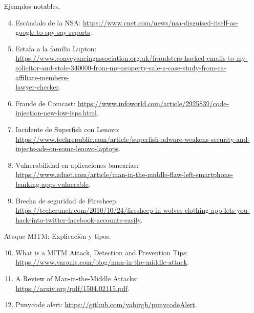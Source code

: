 \documentclass[11pt]{article}
\begin{document}
Ejemplos notables.
\begin{enumerate}
	\setcounter{enumi}{3}
	\item\label{bib-item-4} Escándalo de la NSA: \href{https://www.cnet.com/news/nsa-disguised-itself-as-google-to-spy-say-reports}{https://www.cnet.com/news/nsa-disguised-itself-as-google-to-spy-say-reports}.
	\item\label{bib-item-5} Estafa a la familia Lupton: \href{https://www.conveyancingassociation.org.uk/fraudsters-hacked-emails-to-my-solicitor-and-stole-340000-from-my-property-sale-a-case-study-from-ca-affiliate-members-lawyer-checker}{https://www.conveyancingassociation.org.uk/fraudsters-hacked-emails-to-my-solicitor-and-stole-340000-from-my-property-sale-a-case-study-from-ca-affiliate-members-\\lawyer-checker}.
	\item\label{bib-item-6} Fraude de Comcast: \href{https://www.infoworld.com/article/2925839/code-injection-new-low-isps.html}{https://www.infoworld.com/article/2925839/code-injection-new-low-isps.html}.
	\item\label{bib-item-7} Incidente de Superfish con Lenovo: \href{https://www.techrepublic.com/article/superfish-adware-weakens-security-and-injects-ads-on-some-lenovo-laptops}{https://www.techrepublic.com/article/superfish-adware-weakens-security-and-injects-ads-on-some-lenovo-laptops}.
	\item\label{bib-item-8} Vulnerabilidad en aplicaciones bancarias: \href{https://www.zdnet.com/article/man-in-the-middle-flaw-left-smartphone-banking-apps-vulnerable}{https://www.zdnet.com/article/man-in-the-middle-flaw-left-smartphone-banking-apps-vulnerable}.
	\item\label{bib-item-9} Brecha de seguridad de Firesheep: \href{https://techcrunch.com/2010/10/24/firesheep-in-wolves-clothing-app-lets-you-hack-into-twitter-facebook-accounts-easily}{https://techcrunch.com/2010/10/24/firesheep-in-wolves-clothing-app-lets-you-hack-into-twitter-facebook-accounts-easily}.
\end{enumerate}

Ataque MITM: Explicación y tipos.
\begin{enumerate}
	\setcounter{enumi}{9}
	\item\label{bib-item-10} What is a MITM Attack, Detection and Prevention Tips: \href{https://www.varonis.com/blog/man-in-the-middle-attack}{https://www.varonis.com/blog/man-in-the-middle-attack}.
	\item\label{bib-item-11} A Review of Man-in-the-Middle Attacks: \href{https://arxiv.org/pdf/1504.02115.pdf}{https://arxiv.org/pdf/1504.02115.pdf}.
	\item\label{bib-item-12} Punycode alert: \href{https://github.com/yabirgb/punycodeAlert}{https://github.com/yabirgb/punycodeAlert}.
\end{enumerate}
\end{document}
